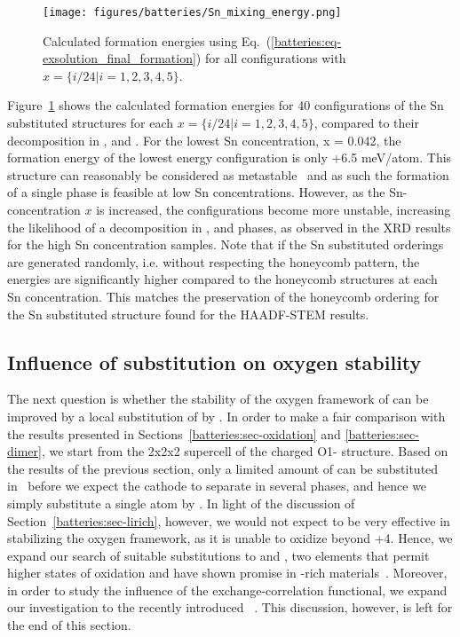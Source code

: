 \begin{refsection}
\begin{figure}[ht] 
\centering 
\captionsetup{width=0.9\linewidth}
\texttt{[image: figures/batteries/Sn\_mixing\_energy.png]} 
\caption{Calculated formation energies using 
Eq.~(\ref{batteries:eq-exsolution_final_formation}) for all configurations 
with $x = \{i/24|i=1,2,3,4,5\}$.} 
\label{batteries:fig-Sn_mixing} 
\end{figure} 
 
Figure~\ref{batteries:fig-Sn_mixing} shows the calculated formation energies 
for 40 configurations of the Sn substituted structures for each $x = 
\{i/24|i=1,2,3,4,5\}$, compared to their decomposition in 
,  and . For the lowest Sn 
concentration, x = 0.042, the formation energy of the lowest energy 
configuration is only +6.5 meV/atom. This structure can 
reasonably be considered as metastable~\cite{Sun2016} and as such the 
formation of a single phase is feasible at low Sn concentrations. However, as 
the Sn-concentration $x$ is increased, the  
configurations become more unstable, increasing the likelihood of a 
decomposition in ,  and  phases, as 
observed in the XRD results for the high Sn concentration samples. Note that 
if the Sn substituted orderings are generated randomly, i.e. without 
respecting the honeycomb pattern, the energies are significantly higher 
compared to the honeycomb structures at each Sn concentration. This matches 
the preservation of the honeycomb ordering for the Sn substituted structure 
found for the HAADF-STEM results. 
 
\subsection{Influence of  substitution on oxygen stability} 
\label{batteries:sec-dimer_substitution} 
 
The next question is whether the stability of the oxygen framework of 
 can be improved by a local substitution of  by . In order 
to make a fair comparison with the results presented in 
Sections~\ref{batteries:sec-oxidation} and \ref{batteries:sec-dimer}, we start 
from the 2x2x2 supercell of the charged O1- structure. Based 
on the results of the previous section, only a limited amount of  can 
be substituted in~ before we expect the cathode to separate in several 
phases, and hence we simply substitute a single  atom by . In 
light of the discussion of Section~\ref{batteries:sec-lirich},  however, we 
would not expect  to be very effective in stabilizing the oxygen 
framework, as it is unable to oxidize beyond +4. Hence, we expand our search 
of suitable substitutions to  and , two elements that permit 
higher states of oxidation and have shown promise in -rich 
materials~\cite{Ma2014, Xiao2012}. Moreover, in order to study the influence of 
the exchange-correlation functional, we expand our investigation to the 
recently introduced ~\cite{Sun2015}. 
This discussion, however, is left for the end of this section.
 

\end{refsection}
